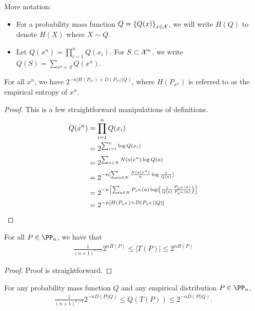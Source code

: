 \begin{definition}
More notation:

\begin{itemize}
  \item For a probability mass function $Q = \left\{ Q(x) \right\}_{x \in \mathcal{X}}$, we will write $H(Q)$ to denote $H(X)$ where $X \sim Q$.
  \item Let $Q(x^n) = \prod_{i=1}^{n} Q(x_i)$.  For $S \subset \mathcal{X}^n$, we write $Q(S) = \sum_{x^n \in S} Q(x^n)$.
\end{itemize}

\begin{theorem}
  For all $x^n$, we have $2^{-n [H(P_{x^n}) + D(P_{x^n} || Q)}$, where $H(P_{x^n})$ is referred to as the empirical entropy of $x^n$.
\end{theorem}

\begin{proof}
  This is a few straightforward manipulations of definitions.
  \begin{align*}
    Q(x^n) &= \prod_{i=1}^{n} Q(x_i) \\
    &= 2^{\sum_{i=1}^{n} \log Q(x_i)} \\
    &= 2^{\sum_{a \in \mathcal{X}} N(a | x^n) \log Q(a)} \\
    &= 2^{-n [ \sum_{a \in \mathcal{X}} \frac{N(a | x^n)}{n} \log \frac{1}{Q(a)}]} \\
    &= 2^{-n \left[ \sum_{a \in \mathcal{X}} P_{x^n} (a) \log \left( \frac{1}{Q(a)} \frac{P_{x^n}(a)}{P_{x^n}(a)} \right)\right]} \\
    &= 2^{-n \left[ H(P_{x^n}) + D(P_{x^n} || Q) \right]}
  \end{align*}
\end{proof} 

\begin{theorem}
  For all $P \in \PP_n$, we have that
  \begin{align*}
    \frac{1}{(n+1)^{r-1}} 2^{n H(P)} \leq |T(P)| \leq 2^{n H(P)}
  \end{align*}
\end{theorem}

\begin{proof}
  Proof is straightforward. 
\end{proof}

\begin{theorem}
  For any probability mass function $Q$ and any empirical distribution $P \in \PP_n$,
\begin{align*}
  \frac{1}{(n+1)^{r-1}}  2^{-n D(P || Q)}  \leq Q(T(P)) \leq 2^{-n D(P || Q)}.
\end{align*}


\end{theorem}
\end{definition}
